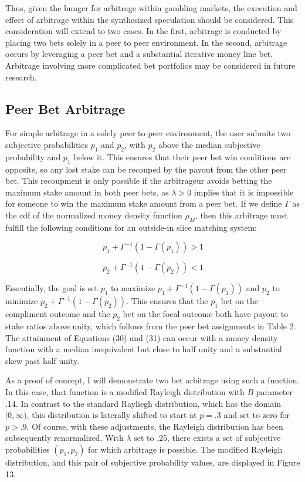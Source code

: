 \documentclass[sn-mathphys-num]{sn-jnl}
\theoremstyle{thmstyleone}%
\theoremstyle{thmstyletwo}%
\theoremstyle{thmstylethree}%
\begin{document}
Thus, given the hunger for arbitrage within gambling markets, the execution and effect of arbitrage within the synthesized speculation should be considered. This consideration will extend to two cases. In the first, arbitrage is conducted by placing two bets solely in a peer to peer environment. In the second, arbitrage occurs by leveraging a peer bet and a substantial iterative money line bet. Arbitrage involving more complicated bet portfolios may be considered in future research. 

\subsection{Peer Bet Arbitrage}

For simple arbitrage in a solely peer to peer environment, the user submits two subjective probabilities $p_1$ and $p_2$, with $p_2$ above the median subjective probability and $p_1$ below it. This ensures that their peer bet win conditions are opposite, so any lost stake can be recouped by the payout from the other peer bet. This recoupment is only possible if the arbitrageur avoids betting the maximum stake amount in both peer bets, as $\lambda > 0$ implies that it is impossible for someone to win the maximum stake amount from a peer bet. If we define $\Gamma$ as the cdf of the normalized money density function $\rho_M$, then this arbitrage must fulfill the following conditions for an outside-in slice matching system:

\begin{equation}
p_1 + \Gamma^{-1}(1-\Gamma(p_1)) > 1
\end{equation}

\begin{equation}
p_2 + \Gamma^{-1}(1-\Gamma(p_2)) < 1
\end{equation}

Essentially, the goal is set $p_1$ to maximize $p_1 + \Gamma^{-1}(1-\Gamma(p_1))$  and $p_2$ to minimize $p_2 + \Gamma^{-1}(1-\Gamma(p_2))$. This ensures that the $p_1$ bet on the compliment outcome and the $p_2$ bet on the focal outcome both have payout to stake ratios above unity, which follows from the peer bet assignments in Table 2. The attainment of Equations (30) and (31) can occur with a money density function with a median inequivalent but close to half unity and  a substantial skew past half unity. 

As a proof of concept, I will demonstrate two bet arbitrage using such a function. In this case, that function is a modified Rayleigh distribution with $B$ parameter .14. In contrast to the standard Rayliegh distribution, which has the domain $[0,\infty)$, this distribution is laterally shifted to start at $p = .3$ and set to zero for $p > .9$. Of course, with these adjustments, the Rayleigh distribution has been subsequently renormalized. With $\lambda$ set to .25, there exists a set of subjective probabilities $(p_1,p_2)$ for which arbitrage is possible. The modified Rayleigh distribution, and this pair of subjective probability values, are displayed in Figure 13.
\end{document}
